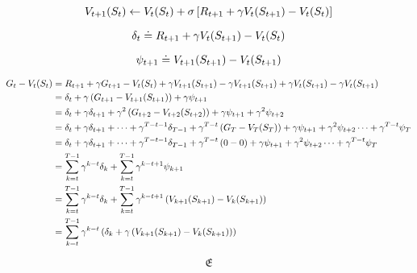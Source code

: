 \documentclass[a4paper,11pt]{article}
\begin{document}

\begin{equation*}
	V_{t+1}\!\left(S_{t}\right)\gets V_{t}\!\left(S_{t}\right)+\sigma\left[R_{t+1}+\gamma V_{t}\!\left(S_{t+1}\right) - V_{t}\!\left(S_{t}\right)\right]
\end{equation*}

\begin{equation*}
	\delta_{t} \mathrel{\doteq} R_{t+1}+\gamma V_{t}\!\left(S_{t+1}\right) - V_{t}\!\left(S_{t}\right)
\end{equation*}

\begin{equation*}
	\psi_{t+1} \mathrel{\doteq} V_{t+1}\!\left(S_{t+1}\right) - V_{t}\!\left(S_{t+1}\right)
\end{equation*}

\begin{align*}
	G_{t} -  \apply{V_{t}}{S_{t}} &= R_{t+1}+\gamma G_{t+1} - \apply{V_{t}}{S_{t}} + \gamma\apply{V_{t+1}}{S_{t+1}} - \gamma\apply{V_{t+1}}{S_{t+1}} + \gamma\apply{V_{t}}{S_{t+1}} - \gamma\apply{V_{t}}{S_{t+1}} \\
	&= \delta_{t} + \gamma\prth{G_{t+1} -\apply{V_{t+1}}{S_{t+1}}} + \gamma \psi_{t+1} \\
	& = \delta_{t} + \gamma \delta_{t+1} + \gamma^{2}\prth{G_{t+2} -\apply{V_{t+2}}{S_{t+2}}} + \gamma \psi_{t+1}+ \gamma^{2} \psi_{t+2} \\
	& = \delta_{t} + \gamma \delta_{t+1} + \dots + \gamma^{T-t-1} \delta_{T-1} + \gamma^{T-t} \prth{ G_{T} - \apply{V_{T}}{S_{T}} } + \gamma \psi_{t+1} + \gamma^{2} \psi_{t+2} \dots + \gamma^{T-t} \psi_{T} \\
	& = \delta_{t} + \gamma \delta_{t+1} + \dots + \gamma^{T-t-1} \delta_{T-1} + \gamma^{T-t} \prth{ 0- 0 } + \gamma \psi_{t+1} + \gamma^{2} \psi_{t+2} \dots + \gamma^{T-t} \psi_{T} \\
	& = \sum_{k=t}^{T-1} \gamma^{k-t}\delta_{k} + \sum_{k=t}^{T-1} \gamma^{k-t+1} \psi_{k+1}  \\
	& = \sum_{k=t}^{T-1} \gamma^{k-t}\delta_{k} + \sum_{k=t}^{T-1} \gamma^{k-t+1} \prth{\apply{V_{k+1}}{S_{k+1}} - \apply{V_{k}}{S_{k+1}}} \\
	& = \sum_{k=t}^{T-1} \gamma^{k-t}\prth{\delta_{k}+\gamma\prth{\apply{V_{k+1}}{S_{k+1}} - \apply{V_{k}}{S_{k+1}}}}
\end{align*}

\begin{equation}
	\mathfrak{E}
\end{equation}
	
\end{document}
